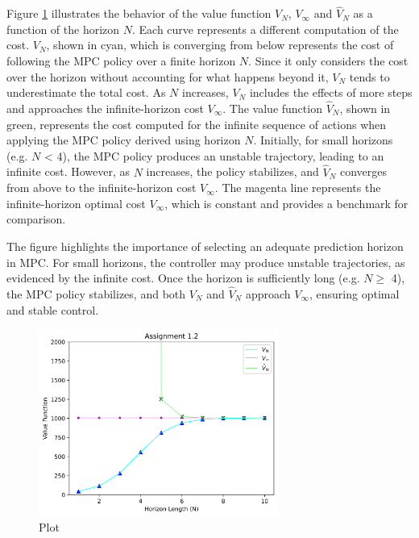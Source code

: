 \documentclass[]{article}
\begin{document}
\begin{flushleft}
Figure \ref{fig:assignment1_2} illustrates the behavior of the value function $ V_N $, $ V_\infty $ and $ \hat{V}_N $ as a function of the horizon $ N $.
Each curve represents a different computation of the cost. $ V_N $, shown in cyan, which is converging from below represents the cost of following the MPC policy over a finite horizon 
$ N $. Since it only considers the cost over the horizon without accounting for what happens beyond it, $V_N$ tends to underestimate the total cost. As $N$ increases, $V_N$ includes the effects of more steps and approaches the infinite-horizon cost $V_\infty$.
The value function $\hat{V}_N$, shown in green, represents the cost computed for the infinite sequence of actions when applying the MPC policy derived using horizon $N$.
Initially, for small horizons (e.g. $N$ < 4), the MPC policy produces an unstable trajectory, leading to an infinite cost. However, as $N$ increases, the policy stabilizes, and 
$\hat{V}_N$ converges from above to the infinite-horizon cost $V_\infty$. The magenta line represents the infinite-horizon optimal cost $V_\infty$, which is constant and provides a benchmark for comparison.  
\end{flushleft}

The figure highlights the importance of selecting an adequate prediction horizon in MPC. For small horizons, the controller may produce unstable trajectories, as evidenced by the infinite cost. Once the horizon is sufficiently long (e.g. $N \geq$ 4), the MPC policy stabilizes, and both $V_N$ and $\hat{V}_N$ approach $V_\infty$, ensuring optimal and stable control.
\begin{figure}[H]
    \centering
    \includegraphics[width=0.7\textwidth]{images/Assignment_12.png}
    \caption{Plot}
    \label{fig:assignment1_2}
\end{figure}
\end{document}
